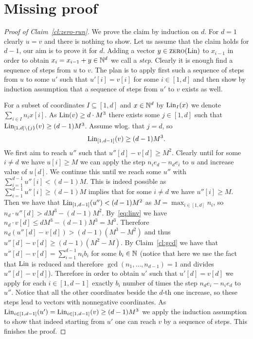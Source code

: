 \section{Missing proof}

\begin{proof}[Proof of Claim~\ref{cl:zero-run}]
We prove the claim by induction on $d$. For $d = 1$ clearly $u = v$ and there is nothing to show.
Let us assume that the claim holds for $d-1$, our aim is to prove it for $d$.
Adding a vector $y \in \textsc{zero}(\textup{Lin})$ to $x_{i-1}$ in order to obtain $x_i = x_{i-1} + y \in \mathbb{N}^d$ we call a \emph{step}.
Clearly it is enough find a sequence of steps from $u$ to $v$.
The plan is to apply first such a sequence of steps from $u$ to some $u'$ such that $u'[i] = v[i]$ for some $i \in [1,d]$
and then show by induction assumption that a sequence of steps from $u'$ to $v$ exists as well.

For a subset of coordinates $I \subseteq [1,d]$ and $x \in \mathbb{N}^d$ by $\textup{Lin}_I(x)$ we denote $\sum_{i \in I} n_i x[i]$.
As $\textup{Lin}(v) \geq d \cdot M^3$ there exists some $j \in [1,d]$ such that $\textup{Lin}_{[1,d] \setminus \{j\}}(v) \geq (d-1) M^3$.
Assume wlog. that $j = d$, so
\begin{equation}\label{eq:linv}
\textup{Lin}_{[1,d-1]}(v) \geq (d-1) M^3.
\end{equation}
We first aim to reach $u''$ such that $u''[d] - v[d] \geq M^2$. Clearly until for some $i \neq d$
we have $u[i] \geq M$ we can apply the step $n_i e_d - n_d e_i$ to $u$ and increase value of $u[d]$. We continue this
until we reach some $u''$ with $\sum_{i=1}^{d-1} u''[i] < (d-1) M$.
This is indeed possible as $\sum_{i=1}^{d-1} u''[i] \geq (d-1) M$ implies that for some $i \neq d$ we have $u''[i] \geq M$. 
Then we have that $\textup{Lin}_{[1,d-1]}(u'') < (d-1) M^2$ as $M = \max_{i \in [1,d]} n_i$, so $n_d \cdot u''[d] > dM^3 - (d-1)M^2$.
By~\eqref{eq:linv} we have $n_d \cdot v[d] \leq dM^3 - (d-1) M^3 = M^3$.
Therefore $n_d (u''[d] - v[d]) > (d-1) (M^3 - M^2)$ and thus $u''[d] - v[d] \geq (d-1) (M^2 - M)$.
By Claim~\ref{cl:gcd} we have that $u''[d] - v[d] = \sum_{i=1}^{d-1} n_i b_i$ for some $b_i \in \mathbb{N}$
(notice that here we use the fact that $\textup{Lin}$ is reduced and therefore $\gcd(n_1, \ldots, n_{d-1}) = 1$
and divides $u''[d] - v[d]$). Therefore in order to obtain $u'$ such that $u'[d] = v[d]$ we apply for each $i \in [1,d-1]$
exactly $b_i$ number of times the step $n_d e_i - n_i e_d$ to $u''$.
Notice that all the other coordinates beside the $d$-th one increase, so these steps lead
to vectors with nonnegative coordinates. As $\textup{Lin}_{i \in [1,d-1]}(u') = \textup{Lin}_{i \in [1,d-1]}(v) \geq (d-1) M^3$ we apply
the induction assumption to show that indeed starting from $u'$ one can reach $v$ by a sequence of steps. This finishes the proof.
\end{proof}



